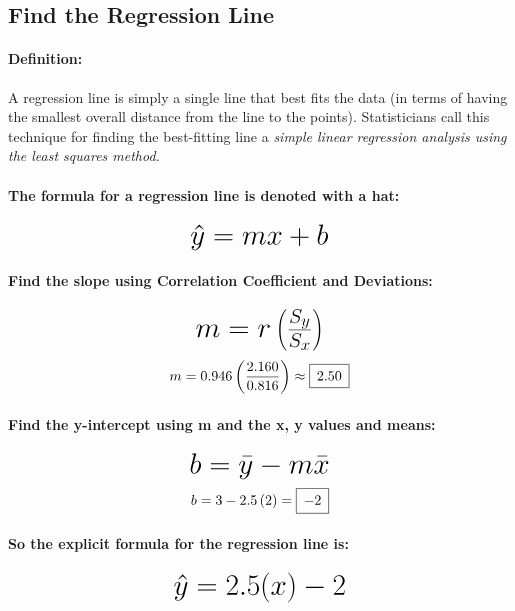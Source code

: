 \documentclass[12pt]{article}
\newcommand{\padBox}[1]{{\setlength\fboxsep{5pt}\boxed{#1}}}
\newcommand*{\mH}[1]{\mbox{\huge$#1$}}
\begin{document}
\subsection{Find the Regression Line}
\paragraph{Definition:}
A regression line is simply a single line that best fits the data (in terms of having the smallest overall distance from the line to the points). Statisticians call this technique for finding the best-fitting line a \emph{simple linear regression analysis using the least squares method.}

\paragraph{The formula for a regression line is denoted with a hat:}
\begin{equation}
	\mH{\hat{y} = mx + b}
\end{equation}

\paragraph{Find the slope using Correlation Coefficient and Deviations:}
\begin{equation}
	\mH{m = r\left(\frac{S_{y}}{S_{x}}\right)}
\end{equation}
\begin{equation}
	m = 0.946\left(\frac{2.160}{0.816}\right) \approx \padBox{2.50}
\end{equation}

\paragraph{Find the y-intercept using m and the x, y values and means:}
\begin{equation}
	\mH{b = \bar{y} - m\bar{x}}
\end{equation}
\begin{equation}
	b = 3 - 2.5\left(2\right) = \padBox{-2}
\end{equation}

\paragraph{So the explicit formula for the regression line is:}
\begin{equation}
	\mH{\hat{y} = 2.5(x) - 2}
\end{equation}
\end{document}

